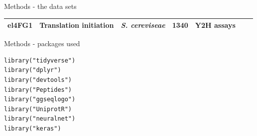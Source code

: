 \documentclass[ignorenonframetext,]{beamer}
\begin{document}
\begin{frame}{Methods - the data sets}
\begin{longtable}[]{@{}lllllll@{}}
\begin{minipage}[t]{0.14\columnwidth}
el4FG1\strut
\end{minipage} & \begin{minipage}[t]{0.12\columnwidth}\raggedright
Translation initiation\strut
\end{minipage} & \begin{minipage}[t]{0.08\columnwidth}\raggedright
\emph{S. cereviseae}\strut
\end{minipage} & \begin{minipage}[t]{0.08\columnwidth}\raggedright
1340\strut
\end{minipage} & \begin{minipage}[t]{0.30\columnwidth}\raggedright
Y2H assays\strut
\end{minipage}\tabularnewline
\bottomrule
\end{longtable}

\end{frame}

\begin{frame}[fragile]{Methods - packages used}
\protect\hypertarget{methods---packages-used}{}

\begin{verbatim}
library("tidyverse")
library("dplyr")
library("devtools")
library("Peptides")
library("ggseqlogo")
library("UniprotR")
library("neuralnet")
library("keras")
\end{verbatim}

\end{frame}
\end{document}
